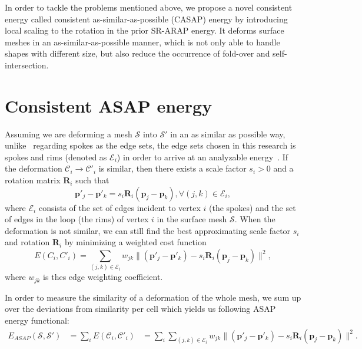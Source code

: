 In order to tackle the problems mentioned above, we propose a novel consistent energy called consistent as-similar-as-possible (CASAP) energy by introducing local scaling to the rotation in the prior SR-ARAP energy. It deforms surface meshes in an as-similar-as-possible manner, which is not only able to handle shapes with different size, but also reduce the occurrence of fold-over and self-intersection.

\section{Consistent ASAP energy}
Assuming we are deforming a mesh $\mathcal S$ into $\mathcal S'$ in an as similar as possible way, unlike~\citep{sorkine2007rigid,yamazaki2013non,yoshiyasu2014conformal} regarding spokes as the edge sets, the edge sets chosen in this research is spokes and rims (denoted as $\mathcal{E}_i$) in order to arrive at an analyzable energy~\cite{chao2010simple}. If the deformation $\mathcal C_i \rightarrow \mathcal  C'_i$ is similar, then there exists a scale factor $s_i > 0$ and a rotation matrix $\mathbf R_i$ such that
\begin{equation}
\mathbf p'_j - \mathbf p'_k = s_i\mathbf R_i(\mathbf p_j - \mathbf p_k), \forall (j,k) \in \mathcal{E}_i,
\end{equation}
where $\mathcal{E}_i$ consists of the set of edges incident to vertex $i$ (the spokes) and the set of edges in the loop (the rims) of vertex $i$ in the surface mesh $\mathcal S$. When the deformation is not similar, we can still find the best approximating scale factor $s_i$ and rotation $\mathbf R_i$ by minimizing a weighted cost function
\begin{equation}
E(C_i,C'_i)=\sum_{(j,k)\in\mathcal{E}_i}w_{jk}\|(\mathbf  p'_j - \mathbf p'_k)-s_i\mathbf R_i(\mathbf  p_j - \mathbf p_k)\|^2,
\end{equation}
where $w_{jk}$ is thes edge weighting coefficient.

In order to measure the similarity of a deformation of the whole mesh, we sum up over the deviations from similarity per cell which yields us following ASAP energy functional:
\begin{align}
E_{ASAP}(\mathcal S, \mathcal S')&=\sum_i E(\mathcal  C_i, \mathcal C'_i)&=\displaystyle \sum_i\!\!\sum_{(j,k)\in\mathcal{E}_i}\!\!\!w_{jk}\|(\mathbf p'_j - \mathbf p'_k)\!-\!s_i\!\mathbf R_i(\mathbf p_j - \mathbf p_k)\|^2.\label{easap1}
\end{align}


